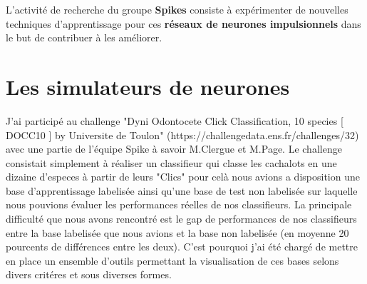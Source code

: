 L'activité de recherche du groupe \textbf{Spikes} consiste à
expérimenter de nouvelles techniques d'apprentissage pour ces
\textbf{réseaux de neurones impulsionnels} dans le but de contribuer à
les améliorer.

\hypertarget{les-simulateurs-de-neurones}{%
\section{Les simulateurs de
neurones}\label{les-simulateurs-de-neurones}}

J'ai participé au challenge "Dyni Odontocete Click Classification, 10 species [ DOCC10 ]
by Universite de Toulon" (https://challengedata.ens.fr/challenges/32) avec une partie de l'équipe Spike à savoir M.Clergue et M.Page. Le challenge consistait simplement à réaliser un classifieur qui classe les cachalots en une dizaine d'especes à partir de leurs "Clics" pour celà nous avions a disposition une base d'apprentissage labelisée ainsi qu'une base de test non labelisée sur laquelle nous pouvions évaluer les performances réelles de nos classifieurs. La principale difficulté que nous avons rencontré est le gap de performances de nos classifieurs entre la base labelisée que nous avions et la base non labelisée (en moyenne 20 pourcents de différences entre les deux). C'est pourquoi j'ai été chargé de mettre en place un ensemble d'outils permettant la visualisation de ces bases selons divers critéres et sous diverses formes.
